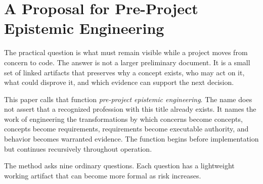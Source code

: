 \documentclass[10pt,a4paper]{article}
\begin{document}
\section{A Proposal for Pre-Project Epistemic Engineering}

The practical question is what must remain visible while a project moves from concern to code. The answer is not a larger preliminary document. It is a small set of linked artifacts that preserves why a concept exists, who may act on it, what could disprove it, and which evidence can support the next decision.

This paper calls that function \emph{pre-project epistemic engineering}. The name does not assert that a recognized profession with this title already exists. It names the work of engineering the transformations by which concerns become concepts, concepts become requirements, requirements become executable authority, and behavior becomes warranted evidence. The function begins before implementation but continues recursively throughout operation.

The method asks nine ordinary questions. Each question has a lightweight working artifact that can become more formal as risk increases.
\end{document}
